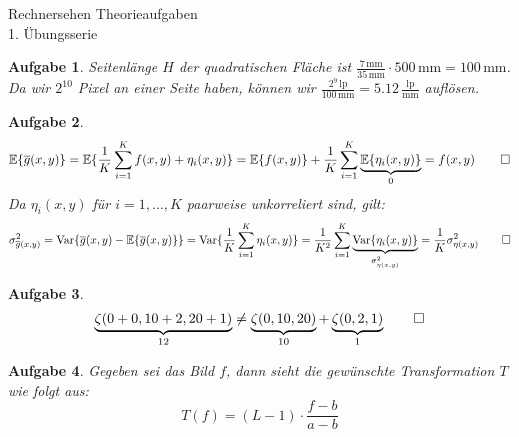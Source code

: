 \documentclass[11pt]{article}
\theoremstyle{break}
\newtheorem{task}{Aufgabe}
\newcommand{\set}[1]{\{#1\}}
\newcommand{\expected}[1]{\mathbb{E}\set{#1}}
\newcommand{\variance}[1]{\text{Var}\set{#1}}
\newcommand{\hw}{1}
\begin{document}
\begin{center}
\Large{Rechnersehen Theorieaufgaben}\\
\large{\hw. Übungsserie}
\end{center}
\begin{task}
    Seitenlänge $H$ der quadratischen Fläche ist $\frac{7\,\text{mm}}{35\,\text{mm}} \cdot 500\,\text{mm} = 100\,\text{mm}$. Da wir $2^{10}$ Pixel an einer Seite haben, können wir $\frac{2^{9}\,\text{lp}}{100\,\text{mm}} = 5.12\,\frac{\text{lp}}{\text{mm}}$ auflösen.
\end{task}

\begin{task}
    $$\expected{\overline{g}(x, y)} = \expected{\frac{1}{K}\sum\limits_{i=1}^K f(x, y) + \eta_i(x, y)} = \expected{f(x, y)} + \frac{1}{K} \sum\limits_{i=1}^K \underbrace{\expected{\eta_i(x, y)}}_0 = f(x, y) \qed$$
    Da $\eta_i(x, y)$ für $i = 1,\dots,K$ paarweise unkorreliert sind, gilt:
    $$\sigma^2_{\overline{g}(x,y)} = \variance{\overline{g}(x,y) - \expected{\overline{g}(x,y)}} = \variance{\frac{1}{K} \sum\limits_{i=1}^K \eta_i(x, y)} = \frac{1}{K^2} \sum\limits_{i=1}^K \underbrace{\variance{\eta_i(x, y)}}_{\sigma^2_{\eta(x, y)}} = \frac{1}{K} \sigma^2_{\eta(x, y)} \qed$$
\end{task}

\begin{task}
    $$\underbrace{\zeta (0 + 0, 10 + 2, 20 + 1)}_{12} \neq \underbrace{\zeta (0, 10, 20)}_{10} + \underbrace{\zeta (0, 2, 1)}_1 \qed$$
\end{task}

\begin{task}
    Gegeben sei das Bild $f$, dann sieht die gewünschte Transformation $T$ wie folgt aus:
    $$T(f) = (L - 1)\cdot \frac{f - b}{a - b}$$
\end{task}
\end{document}
